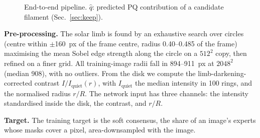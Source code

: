 \documentclass[sigconf]{acmart}
\begin{document}
\begin{figure}[t]
\centering
{}
\caption{End-to-end pipeline. $\hat q$: predicted PQ contribution of a candidate filament (Sec.~\ref{sec:keep}).}
\label{fig:pipeline}
\end{figure}

\textbf{Pre-processing.} The solar limb is found by an exhaustive search over circles (centre within $\pm$160~px of the frame centre, radius 0.40--0.485 of the frame) maximising the mean Sobel edge strength along the circle on a $512^2$ copy, then refined on a finer grid. All training-image radii fall in 894--911~px at $2048^2$ (median 908), with no outliers. From the disk we compute the limb-darkening-corrected contrast $I/I_\mathrm{quiet}(r)$, with $I_\mathrm{quiet}$ the median intensity in 100 rings, and the normalised radius $r/R$. The network input has three channels: the intensity standardised inside the disk, the contrast, and $r/R$.

\textbf{Target.} The training target is the soft consensus, the share of an image's experts whose masks cover a pixel, area-downsampled with the image.
\end{document}
